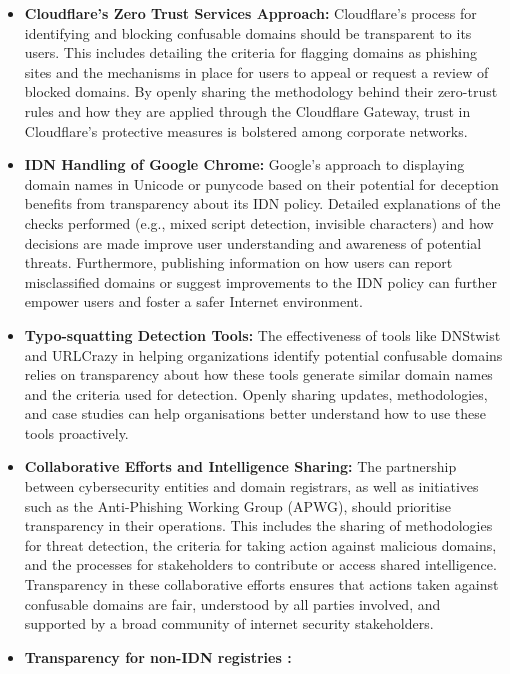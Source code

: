 \begin{itemize}
  \item \textbf{Cloudflare's Zero Trust Services Approach: }Cloudflare's process for identifying and blocking confusable domains should be transparent to its users. This includes detailing the criteria for flagging domains as phishing sites and the mechanisms in place for users to appeal or request a review of blocked domains. By openly sharing the methodology behind their zero-trust rules and how they are applied through the Cloudflare Gateway, trust in Cloudflare's protective measures is bolstered among corporate networks.
  
  
  \item \textbf{IDN Handling of Google Chrome:} Google's approach to displaying domain names in Unicode or punycode based on their potential for deception benefits from transparency about its IDN policy. Detailed explanations of the checks performed (e.g., mixed script detection, invisible characters) and how decisions are made improve user understanding and awareness of potential threats. Furthermore, publishing information on how users can report misclassified domains or suggest improvements to the IDN policy can further empower users and foster a safer Internet environment.
  
  
  \item \textbf{Typo-squatting Detection Tools: }The effectiveness of tools like DNStwist and URLCrazy in helping organizations identify potential confusable domains relies on transparency about how these tools generate similar domain names and the criteria used for detection. Openly sharing updates, methodologies, and case studies can help organisations better understand how to use these tools proactively.
  
  \item \textbf{Collaborative Efforts and Intelligence Sharing: }The partnership between cybersecurity entities and domain registrars, as well as initiatives such as the Anti-Phishing Working Group (APWG), should prioritise transparency in their operations. This includes the sharing of methodologies for threat detection, the criteria for taking action against malicious domains, and the processes for stakeholders to contribute or access shared intelligence. Transparency in these collaborative efforts ensures that actions taken against confusable domains are fair, understood by all parties involved, and supported by a broad community of internet security stakeholders.
  
 \item \textbf{Transparency for non-IDN registries : } 


\end{itemize}
